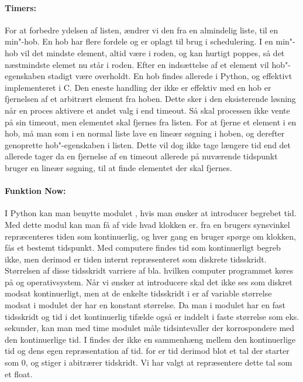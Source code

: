 \paragraph*{Timers:} For at forbedre ydelsen af  listen, ændrer vi den fra en almindelig liste, til en min"-hob. En hob har flere fordele og er oplagt til brug i schedulering. I en min"-hob vil det mindste element, altid være i roden, og kan hurtigt poppes, så det næstmindste elemet nu står i roden. Efter en indsættelse af et element vil hob"-egenskaben stadigt være overholdt. En hob findes allerede i Python, og effektivt implementeret i C. Den eneste handling der ikke er effektiv med en hob er fjernelsen af et arbitrært element fra hoben. Dette sker i den eksisterende løsning når en proces aktivere et andet valg i  end timeout. Så skal processen ikke vente på sin timeout, men elementet skal fjernes fra  listen.  For at fjerne et element i en hob, må man som i en normal liste lave en lineær søgning i hoben, og derefter genoprette hob"-egenskaben i listen. Dette vil dog ikke tage længere tid end det allerede tager da en fjernelse af en timeout allerede på nuværende tidspunkt bruger en lineær søgning, til at finde elementet der skal fjernes. 


\paragraph*{Funktion Now:}
I Python kan man benytte modulet , hvis man ønsker at introducer begrebet tid. Med dette modul kan man få af vide hvad klokken er. fra en brugers synsvinkel repræcenteres tiden som kontinuerlig, og hver gang en bruger spørge om klokken, fås et bestemt tidspunkt. Med computere findes tid som kontinuerligt begreb ikke, men derimod er tiden internt repræsenteret som diskrete tidsskridt. Størrelsen af disse tidsskridt varriere af bla. hvilken computer programmet køres på og operativsystem. Når vi ønsker at introducere \des skal det ikke ses som diskret modsat kontinuerligt, men at de enkelte tidsskridt i \des er af variable størrelse modsat i modulet  der har en konstant størrelse.  Da man i  modulet har en fast tidsskridt og tid i det kontinuerlig tifælde også er inddelt i faste størrelse som eks. sekunder, kan man med time modulet måle tidsintevaller der korrospondere med den kontinuerlige tid. I \des findes der ikke en sammenhæng mellem den kontinuerlige tid og dens egen repræsentation af tid. for \des er tid derimod blot et tal der starter som 0, og stiger i abitrærer tidskridt. Vi har valgt at repræsentere dette tal som et float. 

